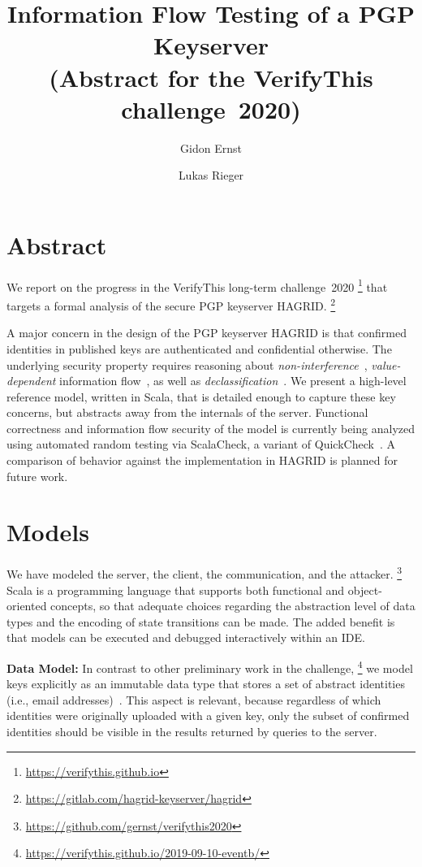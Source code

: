 \documentclass{llncs}
\title{Information Flow Testing of a PGP Keyserver \\
       (Abstract for the VerifyThis challenge~2020)}
\author{Gidon Ernst \and Lukas Rieger}
\institute{LMU Munich, \email{gidon.ernst@lmu.de}}
\begin{document}
\maketitle

\section{Abstract}

We report on the progress in the VerifyThis long-term challenge~2020%
    \footnote{\url{https://verifythis.github.io}}
that targets a formal analysis of the secure PGP keyserver HAGRID.%
    \footnote{\url{https://gitlab.com/hagrid-keyserver/hagrid}}

A major concern in the design of the PGP keyserver HAGRID is that confirmed identities in published keys are authenticated and confidential otherwise.
The underlying security property requires reasoning about \emph{non-interference}~\cite{Goguen_Meseguer_82},
\emph{value-dependent} information flow~\cite{Zheng_Myers_07,Lourenco_Caires_15}, as well as \emph{declassification}~\cite{BanerjeeNR08}.
We present a high-level reference model, written in Scala, that is detailed enough to capture these key concerns, but abstracts away from the internals of the server.
Functional correctness and information flow security of the model is currently being analyzed using automated random testing via ScalaCheck,
a variant of QuickCheck~\cite{claessen2011quickcheck}.
A comparison of behavior against the implementation in HAGRID is planned for future work.

\section{Models}

We have modeled the server, the client, the communication, and the attacker.%
    \footnote{\url{https://github.com/gernst/verifythis2020}}
Scala is a programming language that supports both functional and object-oriented concepts,
so that adequate choices regarding the abstraction level of data types and the encoding of state transitions can be made.
The added benefit is that models can be executed and debugged interactively within an IDE.

\textbf{Data Model:} In contrast to other preliminary work in the challenge,%
    \footnote{\url{https://verifythis.github.io/2019-09-10-eventb/}}
we model keys explicitly as an immutable data type that stores a set of abstract identities (i.e., email addresses)~\cite[Sec~5.11]{callas1998openpgp}.
This aspect is relevant, because regardless of which identities were originally uploaded with a given key,
only the subset of confirmed identities should be visible in the results returned by queries to the server.
\end{document}
